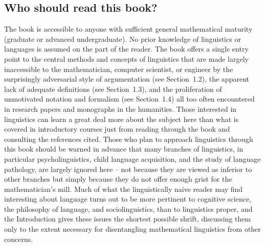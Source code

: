 \subsection*{Who should read this book?} 

The book is accessible to anyone with sufficient general mathematical maturity
(graduate or advanced undergraduate). No prior knowledge of linguistics or
languages is assumed on the part of the reader. The book offers a single entry
point to the central methods and concepts of linguistics that are made largely
inaccessible to the mathematician, computer scientist, or engineer by the
surprisingly adversarial style of argumentation (see Section~1.2), the
apparent lack of adequate definitions (see Section~1.3), and the proliferation
of unmotivated notation and formalism (see Section~1.4) all too often
encountered in research papers and monographs in the humanities. Those
interested in linguistics can learn a great deal more about the subject here
than what is covered in introductory courses just from reading through the
book and consulting the references cited. Those who plan to approach
linguistics through this book should be warned in advance that many branches
of linguistics, in particular psycholinguistics, child language acquisition,
and the study of language pathology, are largely ignored here -- not because
they are viewed as inferior to other branches but simply because they do not
offer enough grist for the mathematician's mill. Much of what the
linguistically naive reader may find interesting about language turns out to
be more pertinent to cognitive science, the philosophy of language, and
sociolinguistics, than to linguistics proper, and the Introduction gives these
issues the shortest possible shrift, discussing them only to the extent
necessary for disentangling mathematical linguistics from other concerns.

